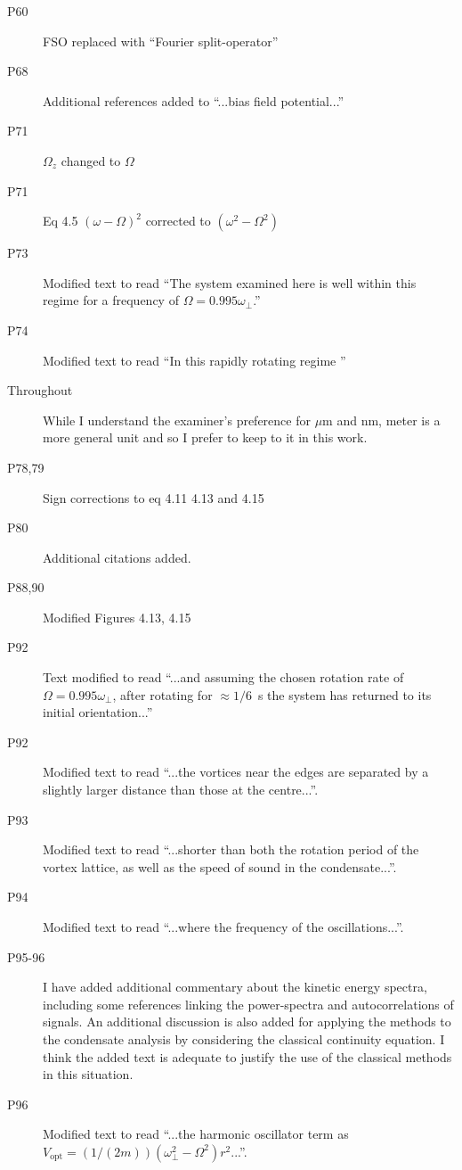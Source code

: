 \documentclass[paper=a4, fontsize=12pt]{scrartcl}
\begin{document}
\begin{description}
    \item [P60] FSO replaced with ``Fourier split-operator''
    \item [P68] Additional references added to ``...bias field potential...''
    \item [P71] $\Omega_z$ changed to $\Omega$
    \item [P71] Eq 4.5 $(\omega - \Omega)^2$ corrected to $(\omega^2 - \Omega^2)$
    \item [P73] Modified text to read ``The system examined here is well within this regime for a frequency of $\Omega = 0.995\omega_\perp$.''
    \item [P74] Modified text to read ``In this rapidly rotating regime ''
    \item [Throughout] While I understand the examiner's preference for $\mu$m and nm, meter is a more general unit and so I prefer to keep to it in this work.
    \item [P78,79] Sign corrections to eq 4.11 4.13 and 4.15
    \item [P80] Additional citations added.
    \item [P88,90] Modified Figures 4.13, 4.15
    \item [P92] Text modified to read ``...and assuming the chosen rotation rate of $\Omega = 0.995\omega_\perp$, after rotating for
    $ \approx 1/6$\ s the system has returned to its initial orientation...''
    \item [P92] Modified text to read ``...the vortices near the edges are separated by a slightly larger distance than those at the centre...''.
    \item [P93] Modified text to read ``...shorter than both the rotation period of the vortex lattice, as well as the speed of sound in the condensate...''.
    \item [P94] Modified text to read ``...where the frequency of the oscillations...''.
    \item [P95-96] I have added additional commentary about the kinetic energy spectra, including some references linking the power-spectra and autocorrelations of signals. An additional discussion is also added for applying the methods to the condensate analysis by considering the classical continuity equation. I think the added text is adequate to justify the use of the classical methods in this situation.
    \item [P96] Modified text to read ``...the harmonic oscillator term  as $V_{\text{opt}} = (1/(2m))(\omega^2_\perp - \Omega^2)
    {r}^2$...''.

\end{description}
\end{document}
